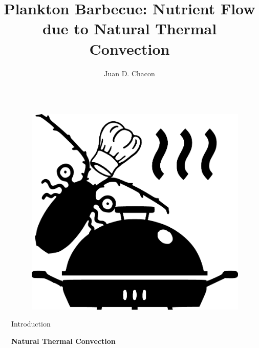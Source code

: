 \documentclass[final]{beamer}
\title{Plankton Barbecue: Nutrient Flow due to Natural Thermal Convection} %
\author{Juan D. Chacon} %
\institute{Simon Fraser University Spring 2019} %
\newlength{\sepwid}
\newlength{\onecolwid}
\begin{document}

\setlength{\belowcaptionskip}{2ex} %
\setlength\belowdisplayshortskip{2ex} %

\begin{frame}[t] %

\begin{columns}[t] %

\begin{column}{\sepwid}\end{column} %

\begin{column}{\onecolwid} %

\begin{figure}
\includegraphics[width=0.45\linewidth]{images/planktonBBQRCropped.pdf}
\end{figure}


\begin{block}{Introduction}

\textbf{Natural Thermal Convection}


\end{block}
\end{column}
\end{columns}
\end{frame}
\end{document}
